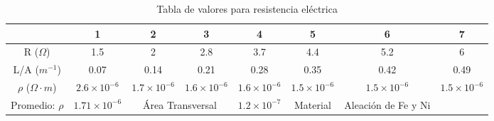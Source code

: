 \documentclass[10pt]{article}
\begin{document}
\begin{table}[H]
	\centering
	\caption{Tabla de valores para resistencia eléctrica}
	\label{tabla-resistencia 2da Medicion}
	\begin{tabular}{cccccccc}
		\toprule
		                          & 1                     & 2                                    & 3                    & 4                    & 5                    & 6                    & 7                    \\
		\midrule
		R ($\Omega$)              & 1.5                   & 2                                    & 2.8                  & 3.7                  & 4.4                  & 5.2                  & 6                    \\
		L/A ($m^{-1}$)            & 0.07                  & 0.14                                 & 0.21                 & 0.28                 & 0.35                 & 0.42                 & 0.49                 \\
		$\rho$ ($\Omega \cdot m$) & $2.6 \times 10^{-6}$  & $1.7 \times 10^{-6}$                 & $1.6 \times 10^{-6}$ & $1.6 \times 10^{-6}$ & $1.5 \times 10^{-6}$ & $1.5 \times 10^{-6}$ & $1.5 \times 10^{-6}$ \\
		Promedio: $\rho$          & $1.71 \times 10^{-6}$ & \multicolumn{2}{c}{Área Transversal} & $1.2 \times 10^{-7}$ & Material             & Aleación de Fe y Ni                                                \\
		\bottomrule
	\end{tabular}
\end{table}
\end{document}
